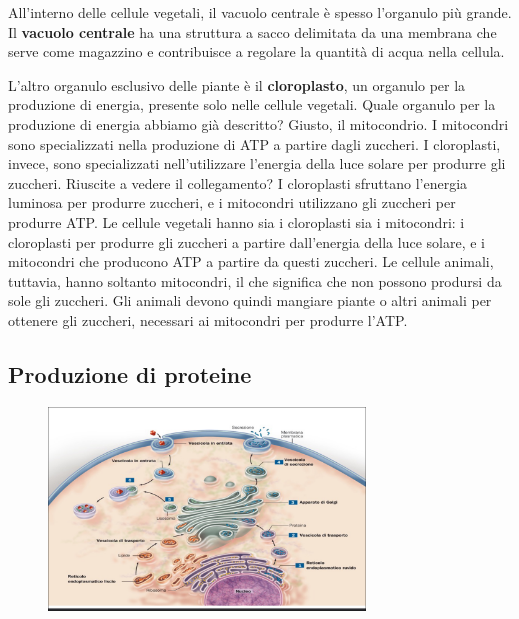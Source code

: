 \documentclass[a4paper]{article}
\begin{document}
All'interno delle cellule vegetali, il vacuolo centrale è spesso l'organulo più grande. Il
\textbf{vacuolo centrale} ha una struttura a sacco delimitata da una membrana che serve come
magazzino e contribuisce a regolare la quantità di acqua nella cellula.

L'altro organulo esclusivo delle piante è il \textbf{cloroplasto}, un organulo per la produzione di
energia, presente solo nelle cellule vegetali. Quale organulo per la produzione di energia
abbiamo già descritto? Giusto, il mitocondrio. I mitocondri sono specializzati nella
produzione di ATP a partire dagli zuccheri. I cloroplasti, invece, sono specializzati
nell'utilizzare l'energia della luce solare per produrre gli zuccheri. Riuscite a vedere il
collegamento? I cloroplasti sfruttano l'energia luminosa per produrre zuccheri, e i mitocondri
utilizzano gli zuccheri per produrre ATP. Le cellule vegetali hanno sia i cloroplasti sia i
mitocondri: i cloroplasti per produrre gli zuccheri a partire dall'energia della luce solare, e i
mitocondri che producono ATP a partire da questi zuccheri. Le cellule animali, tuttavia,
hanno soltanto mitocondri, il che significa che non possono prodursi da sole gli zuccheri. Gli
animali devono quindi mangiare piante o altri animali per ottenere gli zuccheri, necessari ai
mitocondri per produrre l'ATP.



\pagebreak

\subsection{Produzione di proteine}


\begin{figure}[th]
    \centering
    \includegraphics[width=0.75\textwidth]{./prod_cellula.png}
\end{figure}
\end{document}
